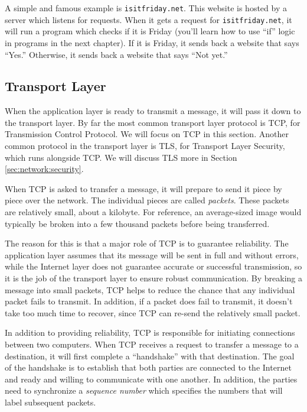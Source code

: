 A simple and famous example is \texttt{isitfriday.net}. This website is hosted by a server which listens for requests. When it gets a request for \texttt{isitfriday.net}, it will run a program which checks if it is Friday (you'll learn how to use ``if'' logic in programs in the next chapter). If it is Friday, it sends back a website that says ``Yes.'' Otherwise, it sends back a website that says ``Not yet.''

\subsection{Transport Layer}

When the application layer is ready to transmit a message, it will pass it down to the transport layer. By far the most common transport layer protocol is TCP, for Transmission Control Protocol. We will focus on TCP in this section. Another common protocol in the transport layer is TLS, for Transport Layer Security, which runs alongside TCP. We will discuss TLS more in Section \ref{sec:network:security}.

When TCP is asked to transfer a message, it will prepare to send it piece by piece over the network. The individual pieces are called \emph{packets}. These packets are relatively small, about a kilobyte. For reference, an average-sized image would typically be broken into a few thousand packets before being transferred. 

The reason for this is that a major role of TCP is to guarantee reliability. The application layer assumes that its message will be sent in full and without errors, while the Internet layer does not guarantee accurate or successful transmission, so it is the job of the transport layer to ensure robust communication. By breaking a message into small packets, TCP helps to reduce the chance that any individual packet fails to transmit. In addition, if a packet does fail to transmit, it doesn't take too much time to recover, since TCP can re-send the relatively small packet.

In addition to providing reliability, TCP is responsible for initiating connections between two computers. When TCP receives a request to transfer a message to a destination, it will first complete a ``handshake'' with that destination. The goal of the handshake is to establish that both parties are connected to the Internet and ready and willing to communicate with one another. In addition, the parties need to synchronize a \emph{sequence number} which specifies the numbers that will label subsequent packets.

